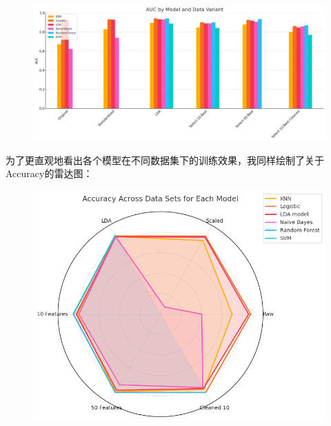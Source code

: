 \documentclass[10pt]{article}
\begin{document}
\begin{figure}[H]
  \centering
  \includegraphics[width=0.8\linewidth]{cls_auc.png}
  \label{fig:80}
\end{figure}
为了更直观地看出各个模型在不同数据集下的训练效果，我同样绘制了关于Accuracy的雷达图：
\begin{figure}[H]
  \centering
  \includegraphics[width=0.7\linewidth]{radar_acc.png}
  \label{fig:81}
\end{figure}
\end{document}
